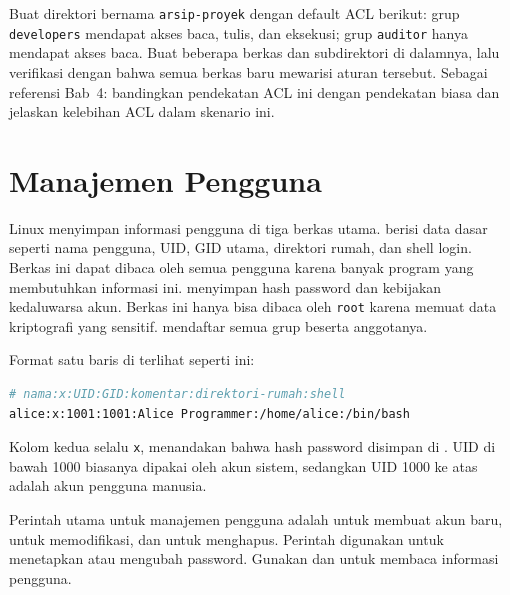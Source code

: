 \begin{challengebox}
Buat direktori bernama \texttt{arsip-proyek} dengan default ACL berikut: grup \texttt{developers} mendapat akses baca, tulis, dan eksekusi; grup \texttt{auditor} hanya mendapat akses baca. Buat beberapa berkas dan subdirektori di dalamnya, lalu verifikasi dengan  bahwa semua berkas baru mewarisi aturan tersebut. Sebagai referensi Bab~4: bandingkan pendekatan ACL ini dengan pendekatan  biasa dan jelaskan kelebihan ACL dalam skenario ini.
\end{challengebox}

\section{Manajemen Pengguna}
\label{sec:user-management}

Linux menyimpan informasi pengguna di tiga berkas utama.  berisi data dasar seperti nama pengguna, UID, GID utama, direktori rumah, dan shell login. Berkas ini dapat dibaca oleh semua pengguna karena banyak program yang membutuhkan informasi ini.  menyimpan hash password dan kebijakan kedaluwarsa akun. Berkas ini hanya bisa dibaca oleh \texttt{root} karena memuat data kriptografi yang sensitif.  mendaftar semua grup beserta anggotanya.

Format satu baris di  terlihat seperti ini:

\begin{lstlisting}[language=bash, caption={Format berkas /etc/passwd}]
# nama:x:UID:GID:komentar:direktori-rumah:shell
alice:x:1001:1001:Alice Programmer:/home/alice:/bin/bash
\end{lstlisting}

Kolom kedua selalu \texttt{x}, menandakan bahwa hash password disimpan di . UID di bawah 1000 biasanya dipakai oleh akun sistem, sedangkan UID 1000 ke atas adalah akun pengguna manusia.

Perintah utama untuk manajemen pengguna adalah  untuk membuat akun baru,  untuk memodifikasi, dan  untuk menghapus. Perintah  digunakan untuk menetapkan atau mengubah password. Gunakan  dan  untuk membaca informasi pengguna.

